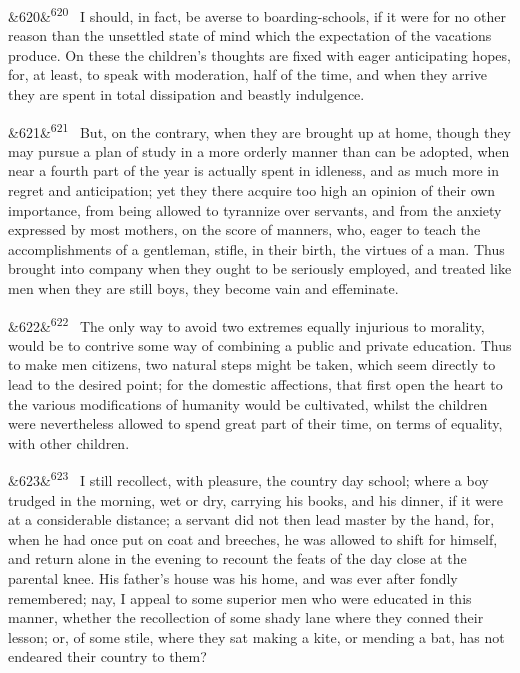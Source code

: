\documentclass[12pt]{article}
\newcommand{\para}[1][]{\par\noindent\ifx&#1&\else\textsuperscript{\footnotesize #1}~\fi}
\begin{document}
\para[620] I should, in fact, be averse to boarding-schools, if it were for no other reason than the unsettled state of mind which the expectation of the vacations produce. On these the children's thoughts are fixed with eager anticipating hopes, for, at least, to speak with moderation, half of the time, and when they arrive they are spent in total dissipation and beastly indulgence.

\para[621] But, on the contrary, when they are brought up at home, though they may pursue a plan of study in a more orderly manner than can be adopted, when near a fourth part of the year is actually spent in idleness, and as much more in regret and anticipation; yet they there acquire too high an opinion of their own importance, from being allowed to tyrannize over servants, and from the anxiety expressed by most mothers, on the score of manners, who, eager to teach the accomplishments of a gentleman, stifle, in their birth, the virtues of a man. Thus brought into company when they ought to be seriously employed, and treated like men when they are still boys, they become vain and effeminate.

\para[622] The only way to avoid two extremes equally injurious to morality, would be to contrive some way of combining a public and private education. Thus to make men citizens, two natural steps might be taken, which seem directly to lead to the desired point; for the domestic affections, that first open the heart to the various modifications of humanity would be cultivated, whilst the children were nevertheless allowed to spend great part of their time, on terms of equality, with other children.

\para[623] I still recollect, with pleasure, the country day school; where a boy trudged in the morning, wet or dry, carrying his books, and his dinner, if it were at a considerable distance; a servant did not then lead master by the hand, for, when he had once put on coat and breeches, he was allowed to shift for himself, and return alone in the evening to recount the feats of the day close at the parental knee. His father's house was his home, and was ever after fondly remembered; nay, I appeal to some superior men who were educated in this manner, whether the recollection of some shady lane where they conned their lesson; or, of some stile, where they sat making a kite, or mending a bat, has not endeared their country to them?
\end{document}
